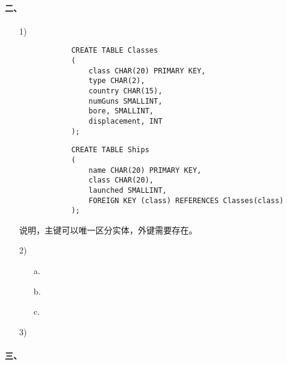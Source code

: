 \documentclass[10pt,a4paper]{article}
\begin{document}
    \paragraph{二、}
    \begin{enumerate}
        \item[1)]\begin{verbatim}
            CREATE TABLE Classes
            (
                class CHAR(20) PRIMARY KEY,
                type CHAR(2),
                country CHAR(15),
                numGuns SMALLINT,
                bore, SMALLINT,
                displacement, INT
            );
        \end{verbatim}
        
        \begin{verbatim}
            CREATE TABLE Ships
            (
                name CHAR(20) PRIMARY KEY,
                class CHAR(20),
                launched SMALLINT,
                FOREIGN KEY (class) REFERENCES Classes(class)
            );
        \end{verbatim}

        说明，主键可以唯一区分实体，外键需要存在。
        \item[2)]\begin{itemize}
            \item[a.]
            \item[b.]
            \item[c.]  
        \end{itemize}
        \item[3)] 
    \end{enumerate}
    \paragraph{三、}
    
\end{document}
